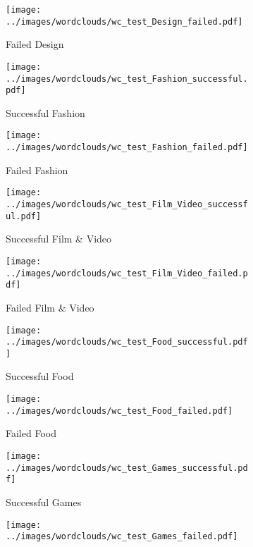 \documentclass{article}
\begin{document}
{\begin{figure}
\begin{subfigure}[e]{0.2\linewidth}
    \label{fig:Design_s_test}
  \end{subfigure} 
  \begin{subfigure}[e']{0.2\linewidth}
    \centering\texttt{[image: ../images/wordclouds/wc\_test\_Design\_failed.pdf]}
    \caption{Failed Design}
    \label{fig:Design_f_test}
  \end{subfigure} 
    \begin{subfigure}[f]{0.2\linewidth}
    \centering\texttt{[image: ../images/wordclouds/wc\_test\_Fashion\_successful.pdf]}
    \caption{Successful Fashion}
    \label{fig:Fashion_s_test}
  \end{subfigure} 
  \begin{subfigure}[f']{0.2\linewidth}
    \centering\texttt{[image: ../images/wordclouds/wc\_test\_Fashion\_failed.pdf]}
    \caption{Failed Fashion}
    \label{fig:Fashion_f_test}
  \end{subfigure}
    \begin{subfigure}[g]{0.2\linewidth}
    \centering\texttt{[image: ../images/wordclouds/wc\_test\_Film\_Video\_successful.pdf]}
    \caption{Successful Film \& Video}
    \label{fig:Film_Video_s_test}
  \end{subfigure} 
  \begin{subfigure}[g']{0.2\linewidth}
    \centering\texttt{[image: ../images/wordclouds/wc\_test\_Film\_Video\_failed.pdf]}
    \caption{Failed Film \& Video}
    \label{fig:Film_Video_f_test}
  \end{subfigure}
    \begin{subfigure}[h]{0.2\linewidth}
    \centering\texttt{[image: ../images/wordclouds/wc\_test\_Food\_successful.pdf]}
    \caption{Successful Food}
    \label{fig:Food_s_test}
  \end{subfigure} 
  \begin{subfigure}[h']{0.2\linewidth}
    \centering\texttt{[image: ../images/wordclouds/wc\_test\_Food\_failed.pdf]}
    \caption{Failed Food}
    \label{fig:Food_f_test}
  \end{subfigure}
    \begin{subfigure}[i]{0.2\linewidth}
    \centering\texttt{[image: ../images/wordclouds/wc\_test\_Games\_successful.pdf]}
    \caption{Successful Games}
    \label{fig:Games_s_test}
  \end{subfigure} 
  \begin{subfigure}[i']{0.2\linewidth}
    \centering\texttt{[image: ../images/wordclouds/wc\_test\_Games\_failed.pdf]}

\end{subfigure}
\end{figure}}
\end{document}
